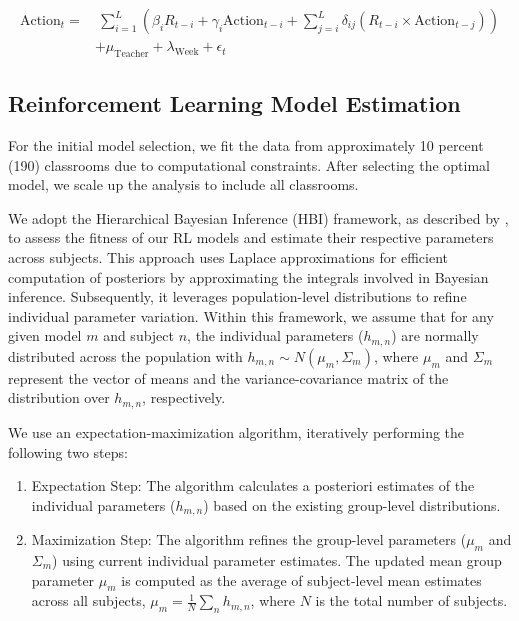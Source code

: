 \documentclass[
  number,
  preprint,
  3p,
  onecolumn]{elsarticle}
\providecommand{\tightlist}{%
  \setlength{\itemsep}{0pt}\setlength{\parskip}{0pt}}\usepackage{longtable,booktabs,array}
\begin{document}
\begin{align*}
\text{Action}_t =& \ \sum_{i=1}^{L} \left( \beta_{i} R_{t-i} + \gamma_i \text{Action}_{t-i} + \sum_{j=i}^{L} \delta_{ij} (R_{t-i} \times \text{Action}_{t-j}) \right) \\
& + \mu_{\text{Teacher}} + \lambda_{\text{Week}} + \epsilon_t
\end{align*}

\subsection{Reinforcement Learning Model
Estimation}\label{reinforcement-learning-model-estimation}

For the initial model selection, we fit the data from approximately 10
percent (190) classrooms due to computational constraints. After
selecting the optimal model, we scale up the analysis to include all
classrooms.

We adopt the Hierarchical Bayesian Inference (HBI) framework, as
described by \citep{piray2019a}, to assess the fitness of our RL models
and estimate their respective parameters across subjects. This approach
uses Laplace approximations for efficient computation of posteriors by
approximating the integrals involved in Bayesian inference.
Subsequently, it leverages population-level distributions to refine
individual parameter variation. Within this framework, we assume that
for any given model \(m\) and subject \(n\), the individual parameters
(\(h_{m,n}\)) are normally distributed across the population with
\(h_{m,n} \sim N(\mu_m, \Sigma_m)\), where \(\mu_m\) and \(\Sigma_m\)
represent the vector of means and the variance-covariance matrix of the
distribution over \(h_{m,n}\), respectively.

We use an expectation-maximization algorithm, iteratively performing the
following two steps:

\begin{enumerate}
\def\labelenumi{\arabic{enumi}.}
\tightlist
\item
  Expectation Step: The algorithm calculates a posteriori estimates of
  the individual parameters (\(h_{m,n}\)) based on the existing
  group-level distributions.
\item
  Maximization Step: The algorithm refines the group-level parameters
  (\(\mu_m\) and \(\Sigma_m\)) using current individual parameter
  estimates. The updated mean group parameter \(\mu_m\) is computed as
  the average of subject-level mean estimates across all subjects,
  \(\mu_m = \frac{1}{N}\sum_{n}h_{m,n}\), where \(N\) is the total
  number of subjects.
\end{enumerate}
\end{document}
